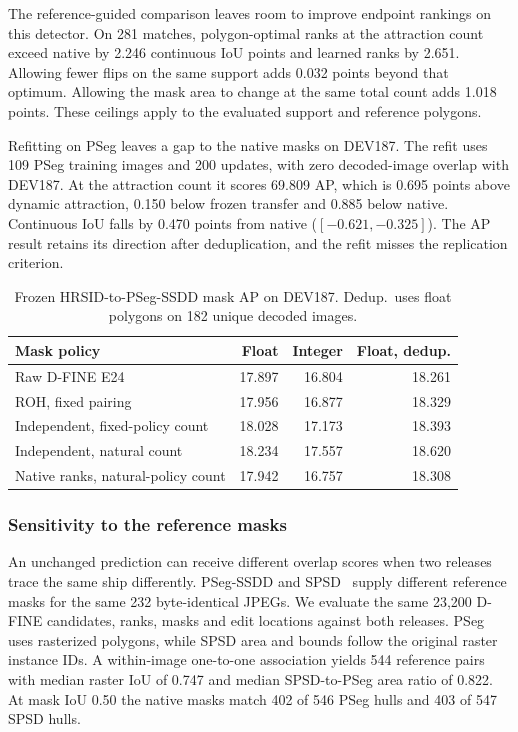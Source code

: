 \documentclass[journal]{IEEEtran}
\begin{document}
The reference-guided comparison leaves room to improve endpoint rankings on this detector. On 281 matches, polygon-optimal ranks at the attraction count exceed native by 2.246 continuous IoU points and learned ranks by 2.651. Allowing fewer flips on the same support adds 0.032 points beyond that optimum. Allowing the mask area to change at the same total count adds 1.018 points. These ceilings apply to the evaluated support and reference polygons.

Refitting on PSeg leaves a gap to the native masks on DEV187. The refit uses 109 PSeg training images and 200 updates, with zero decoded-image overlap with DEV187. At the attraction count it scores 69.809 AP, which is 0.695 points above dynamic attraction, 0.150 below frozen transfer and 0.885 below native. Continuous IoU falls by 0.470 points from native (\([-0.621,-0.325]\)). The AP result retains its direction after deduplication, and the refit misses the replication criterion.

\begin{table}[t]
\centering
\caption{Frozen HRSID-to-PSeg-SSDD mask AP on DEV187. Dedup.\ uses float polygons on 182 unique decoded images.}
\label{tab:ssdd}
\footnotesize
\begin{tabular}{@{}lrrr@{}}
\toprule
Mask policy & Float & Integer & Float, dedup. \\
\midrule
Raw D-FINE E24 & 17.897 & 16.804 & 18.261 \\
ROH, fixed pairing & 17.956 & 16.877 & 18.329 \\
Independent, fixed-policy count & 18.028 & 17.173 & 18.393 \\
\midrule
Independent, natural count & 18.234 & 17.557 & 18.620 \\
Native ranks, natural-policy count & 17.942 & 16.757 & 18.308 \\
\bottomrule
\end{tabular}
\end{table}

\subsubsection{Sensitivity to the reference masks}
An unchanged prediction can receive different overlap scores when two releases trace the same ship differently. PSeg-SSDD and SPSD~\cite{slgsea} supply different reference masks for the same 232 byte-identical JPEGs. We evaluate the same 23,200 D-FINE candidates, ranks, masks and edit locations against both releases. PSeg uses rasterized polygons, while SPSD area and bounds follow the original raster instance IDs. A within-image one-to-one association yields 544 reference pairs with median raster IoU of 0.747 and median SPSD-to-PSeg area ratio of 0.822. At mask IoU 0.50 the native masks match 402 of 546 PSeg hulls and 403 of 547 SPSD hulls.
\end{document}
